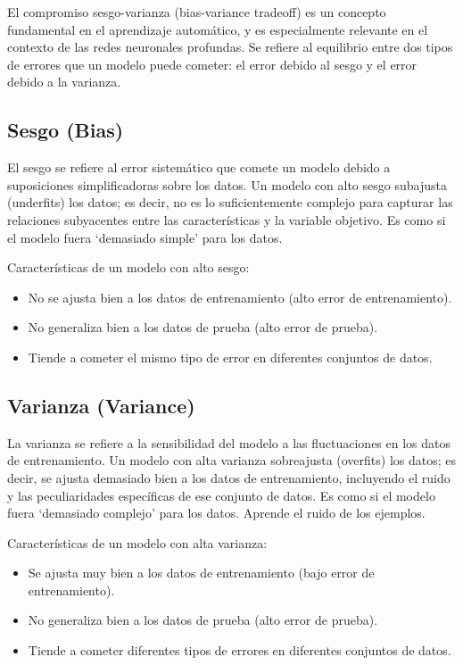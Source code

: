 \documentclass{article}
\begin{document}
El compromiso sesgo-varianza (bias-variance tradeoff) es un concepto fundamental en el aprendizaje automático, y es especialmente relevante en el contexto de las redes neuronales profundas.  Se refiere al equilibrio entre dos tipos de errores que un modelo puede cometer: el error debido al sesgo y el error debido a la varianza.

\subsection{Sesgo (Bias)}

El sesgo se refiere al error sistemático que comete un modelo debido a suposiciones simplificadoras sobre los datos. Un modelo con alto sesgo subajusta (underfits) los datos; es decir, no es lo suficientemente complejo para capturar las relaciones subyacentes entre las características y la variable objetivo.  Es como si el modelo fuera `demasiado simple' para los datos.

Características de un modelo con alto sesgo:

\begin{itemize}
    \item No se ajusta bien a los datos de entrenamiento (alto error de entrenamiento).
    \item No generaliza bien a los datos de prueba (alto error de prueba).
    \item Tiende a cometer el mismo tipo de error en diferentes conjuntos de datos.
\end{itemize}

\subsection{Varianza (Variance)}

La varianza se refiere a la sensibilidad del modelo a las fluctuaciones en los datos de entrenamiento.  Un modelo con alta varianza sobreajusta (overfits) los datos; es decir, se ajusta demasiado bien a los datos de entrenamiento, incluyendo el ruido y las peculiaridades específicas de ese conjunto de datos.  Es como si el modelo fuera `demasiado complejo' para los datos. Aprende el ruido de los ejemplos.

Características de un modelo con alta varianza:

\begin{itemize}
    \item Se ajusta muy bien a los datos de entrenamiento (bajo error de entrenamiento).
    \item No generaliza bien a los datos de prueba (alto error de prueba).
    \item Tiende a cometer diferentes tipos de errores en diferentes conjuntos de datos.
\end{itemize}
\end{document}
